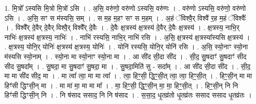 \documentclass[17pt]{extarticle}
\begin{document}
1. मि॒त्रो᳚ ऽस्यसि मि॒त्रो मि॒त्रो॑ ऽसि । . अ॒सि॒ वरु॑णो॒ वरु॑णो ऽस्यसि॒ वरु॑णः । . वरु॑णो ऽस्यसि॒ वरु॑णो॒ वरु॑णो ऽसि । . अ॒सि॒ सꣳ स म॑स्यसि॒ सम् । . स म॒ह म॒हꣳ सꣳ स म॒हम् । . अ॒हं ॅविश्वै॒र् विश्वै॑ र॒ह म॒हं ॅविश्वैः᳚ । . विश्वै᳚र् दे॒वैर् दे॒वैर् विश्वै॒र् विश्वै᳚र् दे॒वैः । . दे॒वैः क्ष॒त्रस्य॑ क्ष॒त्रस्य॑ दे॒वैर् दे॒वैः क्ष॒त्रस्य॑ । . क्ष॒त्रस्य॒ नाभि॒र् नाभिः॑ क्ष॒त्रस्य॑ क्ष॒त्रस्य॒ नाभिः॑ । . नाभि॑ रस्यसि॒ नाभि॒र् नाभि॑ रसि । . अ॒सि॒ क्ष॒त्रस्य॑ क्ष॒त्रस्या᳚स्यसि क्ष॒त्रस्य॑ । . क्ष॒त्रस्य॒ योनि॒र् योनिः॑ क्ष॒त्रस्य॑ क्ष॒त्रस्य॒ योनिः॑ । . योनि॑ रस्यसि॒ योनि॒र् योनि॑ रसि । . अ॒सि॒ स्यो॒नाꣳ स्यो॒ना म॑स्यसि स्यो॒नाम् । . स्यो॒ना मा स्यो॒नाꣳ स्यो॒ना मा । . आ सी॑द सी॒दा सी॑द । . सी॒द॒ सु॒षदाꣳ॑ सु॒षदाꣳ॑ सीद सीद सु॒षदा᳚म् । . सु॒षदा॒ मा सु॒षदाꣳ॑ सु॒षदा॒ मा । . सु॒षदा॒मिति॑ सु - सदा᳚म् । . आ सी॑द सी॒दा सी॑द । . सी॒द॒ मा मा सी॑द सीद॒ मा । . मा त्वा᳚ त्वा॒ मा मा त्वा᳚ । . त्वा॒ हिꣳ॒॒सी॒ द्धिꣳ॒॒सी॒त् त्वा॒ त्वा॒ हिꣳ॒॒सी॒त् । . हिꣳ॒॒सी॒न् मा मा हिꣳ॑सी द्धिꣳसी॒न् मा । . मा मा॑ मा॒ मा मा मा᳚ । . मा॒ हिꣳ॒॒सी॒ द्धिꣳ॒॒सी॒न् मा॒ मा॒ हिꣳ॒॒सी॒त् । . हिꣳ॒॒सी॒न् नि नि हिꣳ॑सी द्धिꣳसी॒न् नि । . नि ष॑साद ससाद॒ नि नि ष॑साद । . स॒सा॒द॒ धृ॒तव्र॑तो धृ॒तव्र॑तः ससाद ससाद धृ॒तव्र॑तः । \newline
\end{document}
